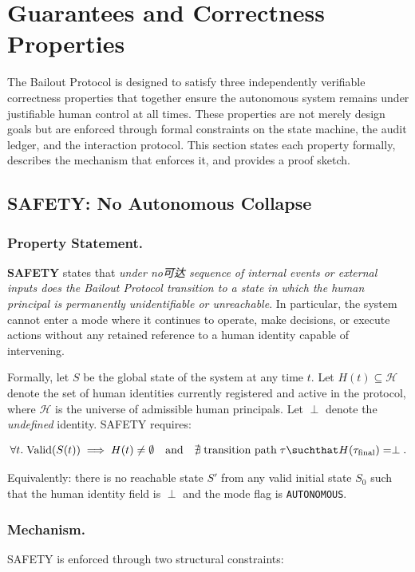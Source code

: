 \section{Guarantees and Correctness Properties}
\label{section:guarantees}

The Bailout Protocol is designed to satisfy three independently verifiable correctness properties that together ensure the autonomous system remains under justifiable human control at all times. These properties are not merely design goals but are enforced through formal constraints on the state machine, the audit ledger, and the interaction protocol. This section states each property formally, describes the mechanism that enforces it, and provides a proof sketch.

\bigskip

\subsection{SAFETY: No Autonomous Collapse}
\label{subsection:safety}

\subsubsection*{Property Statement.}
\textbf{SAFETY} states that \emph{under no可达 sequence of internal events or external inputs does the Bailout Protocol transition to a state in which the human principal is permanently unidentifiable or unreachable}. In particular, the system cannot enter a mode where it continues to operate, make decisions, or execute actions without any retained reference to a human identity capable of intervening.

Formally, let $S$ be the global state of the system at any time $t$. Let $H(t) \subseteq \mathcal{H}$ denote the set of human identities currently registered and active in the protocol, where $\mathcal{H}$ is the universe of admissible human principals. Let $\perp$ denote the \emph{undefined} identity. SAFETY requires:

\[
\forall t.\; \text{Valid}(S(t)) \implies H(t) \neq \emptyset \quad \text{and} \quad \nexists\; \text{transition path}\; \tau \suchthat H(\tau_{\text{final}}) = \perp.
\]

Equivalently: there is no reachable state $S'$ from any valid initial state $S_0$ such that the human identity field is $\perp$ and the mode flag is \texttt{AUTONOMOUS}.

\subsubsection*{Mechanism.}
SAFETY is enforced through two structural constraints:

